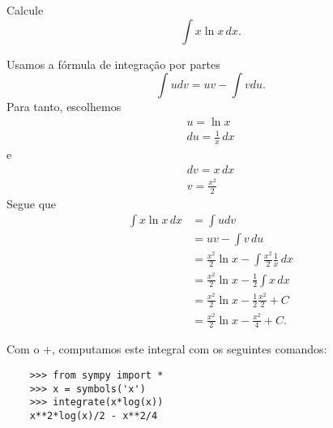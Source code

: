 \begin{exeresol}
  Calcule
  \begin{equation}
    \int x\ln x\,dx.
  \end{equation}
\end{exeresol}
\begin{resol}
  Usamos a fórmula de integração por partes
  \begin{equation}
    \int udv = uv - \int vdu.
  \end{equation}
  Para tanto, escolhemos
  \begin{gather}
    u = \ln x\\
    du = \frac{1}{x}\,dx
  \end{gather}
  e
  \begin{gather}
    dv = x\,dx\\
    v = \frac{x^2}{2}
  \end{gather}
  Segue que
  \begin{align}
    \int x\ln x\,dx &= \int udv\\
                    &= uv - \int v\,du\\
                    &= \frac{x^2}{2}\ln x - \int \frac{x^2}{2}\frac{1}{x}\,dx\\
                    &= \frac{x^2}{2}\ln x - \frac{1}{2}\int x\,dx\\
                    &= \frac{x^2}{2}\ln x - \frac{1}{2}\frac{x^2}{2} + C\\
                    &= \frac{x^2}{2}\ln x - \frac{x^2}{4} + C.
  \end{align}

  \ifispython
  Com o {\python}+{\sympy}, computamos este integral com os seguintes comandos:
  \begin{lstlisting}
    >>> from sympy import *
    >>> x = symbols('x')
    >>> integrate(x*log(x))
    x**2*log(x)/2 - x**2/4
  \end{lstlisting}
  \fi
\end{resol}

